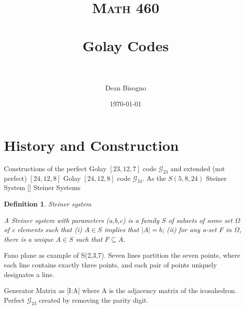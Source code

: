 \documentclass[paper=a4, fontsize=11pt]{scrartcl} %
\title{	
\normalfont \normalsize 
\textsc{Math 460} \\ [25pt] %
\horrule{0.5pt} \\[0.4cm] %
\huge Golay Codes\\ %
\horrule{2pt} \\[0.5cm] %
}
\author{Dean Bisogno} %
\date{\normalsize\today} %
\numberwithin{equation}{section} %
\numberwithin{figure}{section} %
\numberwithin{table}{section} %
\newtheorem{defn}{Definition}
\begin{document}
\maketitle %

\section{History and Construction}
\begin{outline}[enumerate]
   \1 Constructions of the perfect Golay $[23,12,7]$ code $\mathcal{G}_{23}$ and extended (not perfect) $[24,12,8]$ Golay $[24,12,8]$ code $\mathcal{G}_{24}$.
       \2 As the $S(5,8,24)$ Steiner System [\cite{griess}]
         \3 Steiner Systems
           \begin{defn}{Steiner system}

            A Steiner system with parameters (a,b,c) is a family $S$ of subsets of some set $\Omega$ of c elements such that (i) $A \in S$ implies that $|A| = b$; (ii) for any a-set \textit{F} in $\Omega$, there is a unique $A \in S$ such that $\textit{F} \subseteq A$.
           \end{defn}
         \3 Fano plane as example of S(2,3,7). Seven lines partition the seven points, where each line contains exactly three points, and each pair of points uniquely designates a line.


      \2 Generator Matrix as [I:A] where A is the adjacency matrix of the icosahedron.
      \2 Perfect $\mathcal{G}_{23}$ created by removing the parity digit.
\end{outline}
\end{document}
